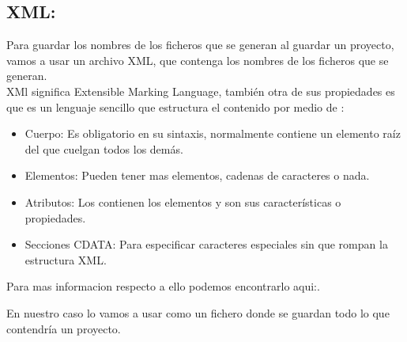 \subsection{XML:}
Para guardar los nombres de los ficheros que se generan al guardar un proyecto, vamos a usar un archivo XML, que contenga los nombres de los ficheros que se generan.\\
XMl significa Extensible Marking Language, también otra de sus propiedades es que es un lenguaje sencillo que estructura el contenido por medio de :
\begin{itemize}
\item Cuerpo: Es obligatorio en su sintaxis, normalmente contiene un elemento raíz del que cuelgan todos los demás.
\item Elementos: Pueden tener mas elementos, cadenas de caracteres o nada.
\item Atributos: Los contienen los elementos y son sus características o propiedades.
\item Secciones CDATA: Para especificar caracteres especiales sin que rompan la estructura XML.
\end{itemize}
 
Para mas informacion respecto a ello podemos encontrarlo aqui:\cite{Wiki:xml}.

En nuestro caso lo vamos a usar como un fichero donde se guardan todo lo que contendría un proyecto.

